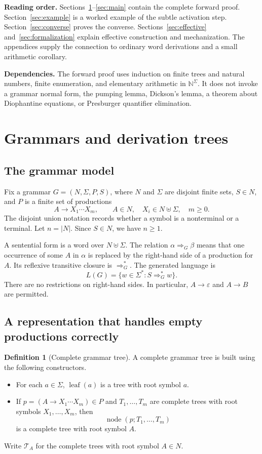 \documentclass[11pt,a4paper]{article}
\numberwithin{equation}{section}
\theoremstyle{plain}
\theoremstyle{definition}
\newtheorem{definition}[theorem]{Definition}
\theoremstyle{remark}
\newcommand{\N}{\mathbb N}
\newcommand{\eps}{\varepsilon}
\newcommand{\Trees}{\mathcal T}
\begin{document}
\textbf{Reading order.} Sections~\ref{sec:trees}--\ref{sec:main} contain the complete forward proof. Section~\ref{sec:example} is a worked example of the subtle activation step. Section~\ref{sec:converse} proves the converse. Sections~\ref{sec:effective} and~\ref{sec:formalization} explain effective construction and mechanization. The appendices supply the connection to ordinary word derivations and a small arithmetic corollary.

\textbf{Dependencies.} The forward proof uses induction on finite trees and natural numbers, finite enumeration, and elementary arithmetic in $\N^\Sigma$. It does not invoke a grammar normal form, the pumping lemma, Dickson's lemma, a theorem about Diophantine equations, or Presburger quantifier elimination.

\section{Grammars and derivation trees}\label{sec:trees}

\subsection{The grammar model}
Fix a grammar $G=(N,\Sigma,P,S)$, where $N$ and $\Sigma$ are disjoint finite sets, $S\in N$, and $P$ is a finite set of productions
\[
A\to X_1\cdots X_m,
\qquad A\in N,\quad X_i\in N\uplus\Sigma,\quad m\geq 0.
\]
The disjoint union notation records whether a symbol is a nonterminal or a terminal. Let $n=|N|$. Since $S\in N$, we have $n\geq1$.

A sentential form is a word over $N\uplus\Sigma$. The relation $\alpha\Rightarrow_G\beta$ means that one occurrence of some $A$ in $\alpha$ is replaced by the right-hand side of a production for $A$. Its reflexive transitive closure is $\Rightarrow_G^*$. The generated language is
\[
L(G)=\{w\in\Sigma^*:S\Rightarrow_G^*w\}.
\]
There are no restrictions on right-hand sides. In particular, $A\to\eps$ and $A\to B$ are permitted.

\subsection{A representation that handles empty productions correctly}
\begin{definition}[Complete grammar tree]\label{def:tree}
A complete grammar tree is built using the following constructors.
\begin{itemize}
\item For each $a\in\Sigma$, $\operatorname{leaf}(a)$ is a tree with root symbol $a$.
\item If $p=(A\to X_1\cdots X_m)\in P$ and $T_1,\ldots,T_m$ are complete trees with root symbols $X_1,\ldots,X_m$, then
\[
\operatorname{node}(p;T_1,\ldots,T_m)
\]
is a complete tree with root symbol $A$.
\end{itemize}
Write $\Trees_A$ for the complete trees with root symbol $A\in N$.
\end{definition}
\end{document}
